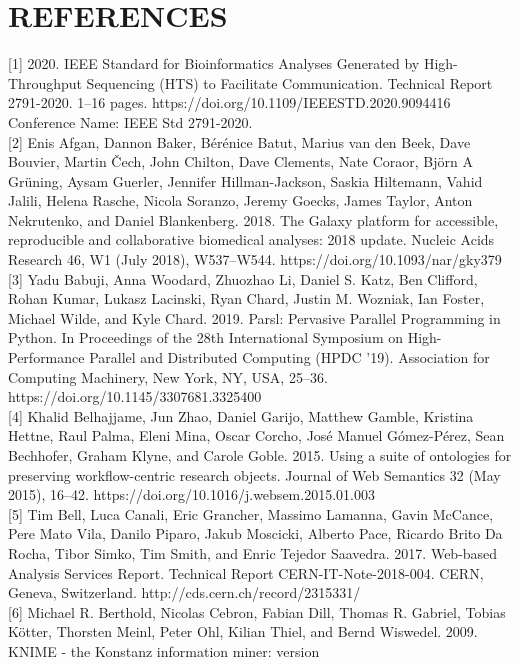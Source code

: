 \documentclass[
]{article}
\begin{document}
\section{REFERENCES}\label{references}

{[}1{]} 2020. IEEE Standard for Bioinformatics Analyses Generated by
High-Throughput Sequencing (HTS) to Facilitate Communication. Technical
Report 2791-2020. 1--16 pages.
https://doi.org/10.1109/IEEESTD.2020.9094416 Conference Name: IEEE Std
2791-2020.\\
{[}2{]} Enis Afgan, Dannon Baker, Bérénice Batut, Marius van den Beek,
Dave Bouvier, Martin Čech, John Chilton, Dave Clements, Nate Coraor,
Björn A Grüning, Aysam Guerler, Jennifer Hillman-Jackson, Saskia
Hiltemann, Vahid Jalili, Helena Rasche, Nicola Soranzo, Jeremy Goecks,
James Taylor, Anton Nekrutenko, and Daniel Blankenberg. 2018. The Galaxy
platform for accessible, reproducible and collaborative biomedical
analyses: 2018 update. Nucleic Acids Research 46, W1 (July 2018),
W537--W544. https://doi.org/10.1093/nar/gky379\\
{[}3{]} Yadu Babuji, Anna Woodard, Zhuozhao Li, Daniel S. Katz, Ben
Clifford, Rohan Kumar, Lukasz Lacinski, Ryan Chard, Justin M. Wozniak,
Ian Foster, Michael Wilde, and Kyle Chard. 2019. Parsl: Pervasive
Parallel Programming in Python. In Proceedings of the 28th International
Symposium on High-Performance Parallel and Distributed Computing (HPDC
'19). Association for Computing Machinery, New York, NY, USA, 25--36.
https://doi.org/10.1145/3307681.3325400\\
{[}4{]} Khalid Belhajjame, Jun Zhao, Daniel Garijo, Matthew Gamble,
Kristina Hettne, Raul Palma, Eleni Mina, Oscar Corcho, José Manuel
Gómez-Pérez, Sean Bechhofer, Graham Klyne, and Carole Goble. 2015. Using
a suite of ontologies for preserving workflow-centric research objects.
Journal of Web Semantics 32 (May 2015), 16--42.
https://doi.org/10.1016/j.websem.2015.01.003\\
{[}5{]} Tim Bell, Luca Canali, Eric Grancher, Massimo Lamanna, Gavin
McCance, Pere Mato Vila, Danilo Piparo, Jakub Moscicki, Alberto Pace,
Ricardo Brito Da Rocha, Tibor Simko, Tim Smith, and Enric Tejedor
Saavedra. 2017. Web-based Analysis Services Report. Technical Report
CERN-IT-Note-2018-004. CERN, Geneva, Switzerland.
http://cds.cern.ch/record/2315331/\\
{[}6{]} Michael R. Berthold, Nicolas Cebron, Fabian Dill, Thomas R.
Gabriel, Tobias Kötter, Thorsten Meinl, Peter Ohl, Kilian Thiel, and
Bernd Wiswedel. 2009. KNIME - the Konstanz information miner: version
\end{document}
